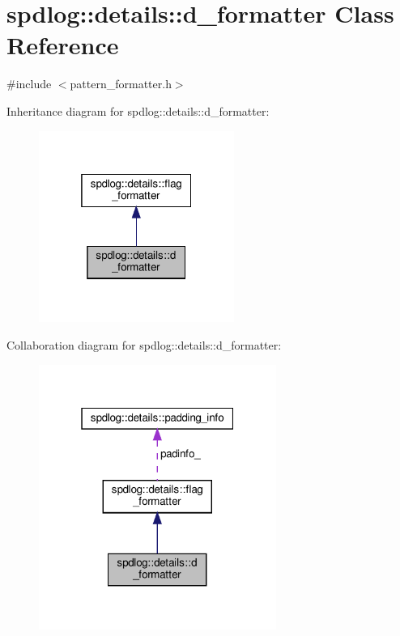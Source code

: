 \hypertarget{classspdlog_1_1details_1_1d__formatter}{}\section{spdlog\+:\+:details\+:\+:d\+\_\+formatter Class Reference}
\label{classspdlog_1_1details_1_1d__formatter}


{\ttfamily \#include $<$pattern\+\_\+formatter.\+h$>$}



Inheritance diagram for spdlog\+:\+:details\+:\+:d\+\_\+formatter\+:
\nopagebreak
\begin{figure}[H]
\begin{center}
\leavevmode
\includegraphics[width=181pt]{classspdlog_1_1details_1_1d__formatter__inherit__graph}
\end{center}
\end{figure}


Collaboration diagram for spdlog\+:\+:details\+:\+:d\+\_\+formatter\+:
\nopagebreak
\begin{figure}[H]
\begin{center}
\leavevmode
\includegraphics[width=220pt]{classspdlog_1_1details_1_1d__formatter__coll__graph}
\end{center}
\end{figure}
